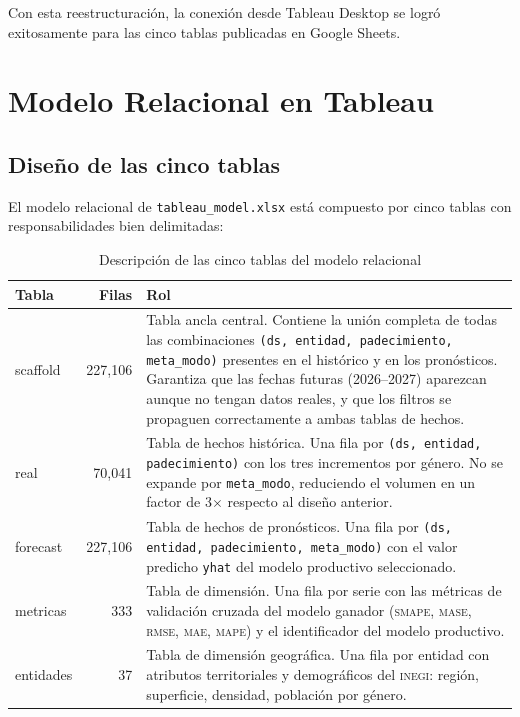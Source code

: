 \documentclass[12pt, letterpaper]{article}
\newcommand{\smape}{\textnormal{\textsc{smape}}}
\newcommand{\mase}{\textnormal{\textsc{mase}}}
\newcommand{\rmse}{\textnormal{\textsc{rmse}}}
\newcommand{\mae}{\textnormal{\textsc{mae}}}
\newcommand{\mape}{\textnormal{\textsc{mape}}}
\begin{document}
Con esta reestructuración, la conexión desde Tableau Desktop se logró exitosamente para las cinco tablas publicadas en Google Sheets.

\newpage
\section{Modelo Relacional en Tableau}\label{sec:modelo_relacional}

\subsection{Diseño de las cinco tablas}

El modelo relacional de \texttt{tableau\_model.xlsx} está compuesto por cinco tablas con responsabilidades bien delimitadas:

\begin{table}[H]
\centering
\caption{Descripción de las cinco tablas del modelo relacional}
\label{tab:tablas}
\small
\begin{tabularx}{\textwidth}{>{\ttfamily}l r X}
\toprule
\textbf{Tabla} & \textbf{Filas} & \textbf{Rol} \\
\midrule
scaffold  & 227,106 & Tabla ancla central. Contiene la unión completa de todas las combinaciones \texttt{(ds, entidad, padecimiento, meta\_modo)} presentes en el histórico y en los pronósticos. Garantiza que las fechas futuras (2026--2027) aparezcan aunque no tengan datos reales, y que los filtros se propaguen correctamente a ambas tablas de hechos. \\
real      & 70,041  & Tabla de hechos histórica. Una fila por \texttt{(ds, entidad, padecimiento)} con los tres incrementos por género. No se expande por \texttt{meta\_modo}, reduciendo el volumen en un factor de 3$\times$ respecto al diseño anterior. \\
forecast  & 227,106 & Tabla de hechos de pronósticos. Una fila por \texttt{(ds, entidad, padecimiento, meta\_modo)} con el valor predicho \texttt{yhat} del modelo productivo seleccionado. \\
metricas  & 333     & Tabla de dimensión. Una fila por serie con las métricas de validación cruzada del modelo ganador (\smape{}, \mase{}, \rmse{}, \mae{}, \mape{}) y el identificador del modelo productivo. \\
entidades & 37      & Tabla de dimensión geográfica. Una fila por entidad con atributos territoriales y demográficos del \textsc{inegi}: región, superficie, densidad, población por género. \\
\bottomrule
\end{tabularx}
\end{table}
\end{document}
